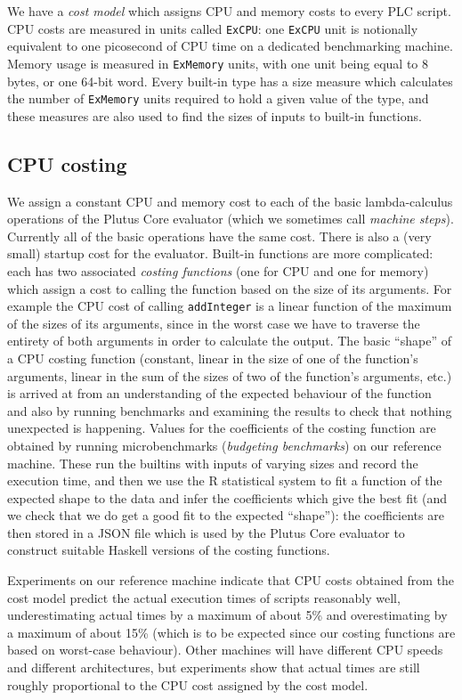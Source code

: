 \documentclass[a4paper]{article}
\begin{document}
We have a \textit{cost model} which assigns CPU and memory costs to every PLC
script.  CPU costs are measured in units called \texttt{ExCPU}: one
\texttt{ExCPU} unit is notionally equivalent to one picosecond of CPU time on a
dedicated benchmarking machine.  Memory usage is measured in \texttt{ExMemory}
units, with one unit being equal to 8 bytes, or one 64-bit word.  Every built-in
type has a size measure which calculates the number of \texttt{ExMemory} units
required to hold a given value of the type, and these measures are also used to
find the sizes of inputs to built-in functions.

\subsection{CPU costing}  We assign a constant CPU and memory cost to each of
the basic lambda-calculus operations of the Plutus Core evaluator (which we
sometimes call \textit{machine steps}).  Currently all of the basic operations
have the same cost.  There is also a (very small) startup cost for the
evaluator.  Built-in functions are more complicated: each has two associated
\textit{costing functions} (one for CPU and one for memory) which assign a cost
to calling the function based on the size of its arguments.  For example the CPU
cost of calling \texttt{addInteger} is a linear function of the maximum of the
sizes of its arguments, since in the worst case we have to traverse the entirety
of both arguments in order to calculate the output. The basic ``shape'' of a CPU
costing function (constant, linear in the size of one of the function's
arguments, linear in the sum of the sizes of two of the function's arguments,
etc.) is arrived at from an understanding of the expected behaviour of the
function and also by running benchmarks and examining the results to check that
nothing unexpected is happening.  Values for the coefficients of the costing
function are obtained by running microbenchmarks (\textit{budgeting benchmarks})
on our reference machine.  These run the builtins with inputs of varying sizes
and record the execution time, and then we use the R statistical system to fit a
function of the expected shape to the data and infer the coefficients which give
the best fit (and we check that we do get a good fit to the expected ``shape''):
the coefficients are then stored in a JSON file which is used by the Plutus Core
evaluator to construct suitable Haskell versions of the costing functions.

Experiments on our reference machine indicate that CPU costs obtained from the
cost model predict the actual execution times of scripts reasonably well,
underestimating actual times by a maximum of about 5\% and overestimating by a
maximum of about 15\% (which is to be expected since our costing functions are
based on worst-case behaviour).  Other machines will have different CPU speeds
and different architectures, but experiments show that actual times are still
roughly proportional to the CPU cost assigned by the cost model.
\end{document}
